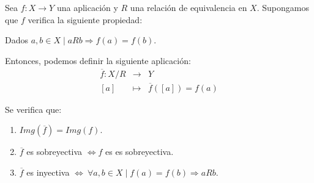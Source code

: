 \begin{prop}
    Sea $f:X \rightarrow Y$ una aplicación y $R$ una relación de equivalencia en $X$. Supongamos que $f$ verifica la siguiente propiedad:
    \begin{center}
        Dados $a,b \in X \mid aRb \Rightarrow f(a) = f(b)$.
    \end{center}
    
    Entonces, podemos definir la siguiente aplicación:
    \begin{equation*}
        \begin{array}{rll}
            \overline{f}: X/R & \longrightarrow & Y\\
                \left[ a \right] & \longmapsto & \overline{f}\left([a]\right)=f(a)
        \end{array}
    \end{equation*}
    
    Se verifica que:
    \begin{enumerate}
        \item $Img\left(\overline{f}\right) = Img(f)$.
        \item $\overline{f}$ es sobreyectiva $\Longleftrightarrow f$ es es sobreyectiva.
        \item $\overline{f}$ es inyectiva $\Longleftrightarrow~\forall a,b \in X \mid f(a) = f(b) \Rightarrow aRb$.
    \end{enumerate}
\end{prop}
